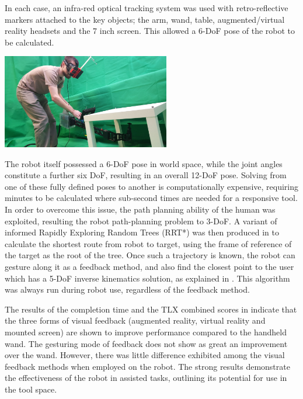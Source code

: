\documentclass[11pt]{article}
\begin{document}
In each case, an infra-red optical tracking system was used with retro-reflective markers attached to the key objects; the arm, wand, table, augmented/virtual reality headsets and the 7 inch screen. This allowed a 6-DoF pose of the robot to be calculated.

\begin{center}
\includegraphics[width=0.55\textwidth]{vrrobot.png}
\label{figure:vrrobot}
\end{center} 
 
The robot itself possessed a 6-DoF pose in world space, while the joint angles constitute a further six DoF, resulting in an overall 12-DoF pose. Solving from one of these fully defined poses to another is computationally expensive, requiring minutes to be calculated where sub-second times are needed for a responsive tool. In order to overcome this issue, the path planning ability of the human was exploited, resulting the robot path-planning problem to 3-DoF. A variant of informed Rapidly Exploring Random Trees (RRT*) \cite{Gammell2014} was then produced in \cite{GreggSmithFeedback} to calculate the shortest route from robot to target, using the frame of reference of the target as the root of the tree. Once such a trajectory is known, the robot can gesture along it as a feedback method, and also find the closest point to the user which has a 5-DoF inverse kinematics solution, as explained in \cite{GreggSmithKinematics}. This algorithm was always run during robot use, regardless of the feedback method.

The results of the completion time and the TLX combined scores in \cite{GreggSmithFeedback} indicate that the three forms of visual feedback (augmented reality, virtual reality and mounted screen) are shown to improve performance compared to the handheld wand. The gesturing mode of feedback does not show as great an improvement over the wand. However, there was little difference exhibited among the visual feedback methods when employed on the robot. The strong results demonstrate the effectiveness of the robot in assisted tasks, outlining its potential for use in the tool space.
	
\end{document}
